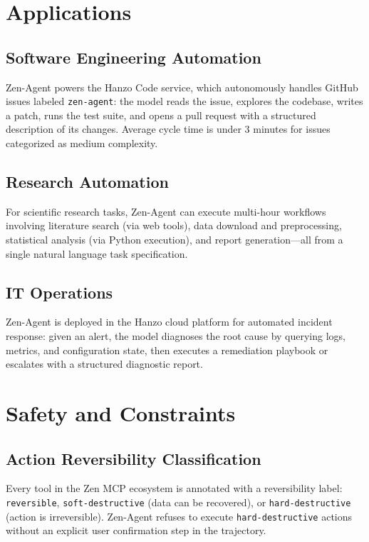 \documentclass[11pt,a4paper]{article}
\begin{document}
\section{Applications}

\subsection{Software Engineering Automation}

Zen-Agent powers the Hanzo Code service, which autonomously handles GitHub issues labeled
\texttt{zen-agent}: the model reads the issue, explores the codebase, writes a patch, runs
the test suite, and opens a pull request with a structured description of its changes.
Average cycle time is under 3 minutes for issues categorized as medium complexity.

\subsection{Research Automation}

For scientific research tasks, Zen-Agent can execute multi-hour workflows involving literature
search (via web tools), data download and preprocessing, statistical analysis (via Python
execution), and report generation---all from a single natural language task specification.

\subsection{IT Operations}

Zen-Agent is deployed in the Hanzo cloud platform for automated incident response: given an
alert, the model diagnoses the root cause by querying logs, metrics, and configuration state,
then executes a remediation playbook or escalates with a structured diagnostic report.

\section{Safety and Constraints}

\subsection{Action Reversibility Classification}

Every tool in the Zen MCP ecosystem is annotated with a reversibility label:
\texttt{reversible}, \texttt{soft-destructive} (data can be recovered), or
\texttt{hard-destructive} (action is irreversible). Zen-Agent refuses to execute
\texttt{hard-destructive} actions without an explicit user confirmation step in the trajectory.
\end{document}
